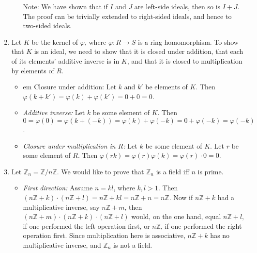 \documentclass[11pt]{article} \usepackage{amssymb}
\newcommand{\Z}{\mathbb Z} \newcommand{\CalE}{{\mathcal{E}}}
\renewcommand{\phi}{\varphi}
\begin{document}
\begin{enumerate}
\begin{itemize}
      Note: We have shown that if $I$ and $J$ are left-side ideals, then
      so is $I+J$. The proof can be trivially extended to right-sided ideals,
      and hence to two-sided ideals.
    \end{itemize}
  \item Let $K$ be the kernel of $\phi$, where $\phi:R\to S$ is a ring 
    homomorphism. To show that $K$ is an ideal, we need to show that it is 
    closed under addition, that each of its elements' additive inverse is in $K$,
    and that it is closed to multiplication by elements of $R$. 
    \begin{itemize}
      \item {em Closure under addition:} Let $k$ and
        $k'$ be elements of $K$. Then $\phi(k+k')=\phi(k)+\phi(k')=0+0=0$.
      \item {\em Additive inverse:} Let $k$ be some element of $K$. Then
        $0=\phi(0)=\phi(k+(-k))=\phi(k)+\phi(-k)=0+\phi(-k)=\phi(-k)$.
      \item {\em Closure under multiplication in $R$:} 
        Let $k$ be some element of $K$.
        Let $r$ be some element of $R$. Then 
        $\phi(rk)=\phi(r)\phi(k)=\phi(r)\cdot 0=0$.
    \end{itemize}
  \item
    Let $\Z_n=\Z/n\Z$. We would like to prove that $\Z_n$ is a field iff $n$ is
    prime. 

    \begin{itemize}
    \item {\em First direction:}
      Assume $n=kl$, where $k,l>1$. Then $(n\Z+k)\cdot(n\Z+l)=n\Z+kl=n\Z+n=n\Z$.
      Now if $n\Z+k$ had a multiplicative inverse, say $n\Z+m$, then
      $(n\Z+m)\cdot(n\Z+k)\cdot(n\Z+l)$ would, on the one hand, equal $n\Z+l$,
      if one performed the left operation first, or $n\Z$, if one performed the
      right operation first. Since multiplication here is associative, $n\Z+k$
      has no multiplicative inverse, and $\Z_n$ is not a field.
      

\end{itemize}
\end{enumerate}
\end{document}

